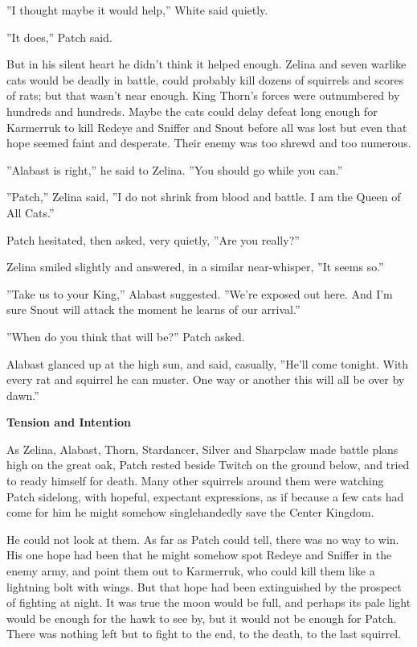 \documentclass[11pt]{article}
\begin{document}
 ''I thought maybe it would help,'' White said quietly.\par
 ''It does,'' Patch said.\par
 But in his silent heart he didn't think it helped enough. Zelina and seven warlike cats would be deadly in battle, could probably kill dozens of squirrels and scores of rats; but that wasn't near enough. King Thorn's forces were outnumbered by hundreds and hundreds. Maybe the cats could delay defeat long enough for Karmerruk to kill Redeye and Sniffer and Snout before all was lost %
 but even that hope seemed faint and desperate. Their enemy was too shrewd and too numerous.\par
 ''Alabast is right,'' he said to Zelina. ''You should go while you can.''\par
 ''Patch,'' Zelina said, ''I do not shrink from blood and battle. I am the Queen of All Cats.''\par
 Patch hesitated, then asked, very quietly, ''Are you really?''\par
 Zelina smiled slightly and answered, in a similar near-whisper, ''It seems so.''\par
 ''Take us to your King,'' Alabast suggested. ''We're exposed out here. And I'm sure Snout will attack the moment he learns of our arrival.''\par
 ''When do you think that will be?'' Patch asked.\par
 Alabast glanced up at the high sun, and said, casually, ''He'll come tonight. With every rat and squirrel he can muster. One way or another this will all be over by dawn.''\par
\par
{\bf Tension and Intention\par
}\par
 As Zelina, Alabast, Thorn, Stardancer, Silver and Sharpclaw made battle plans high on the great oak, Patch rested beside Twitch on the ground below, and tried to ready himself for death. Many other squirrels around them were watching Patch sidelong, with hopeful, expectant expressions, as if because a few cats had come for him he might somehow singlehandedly save the Center Kingdom.\par
He could not look at them. As far as Patch could tell, there was no way to win. His one hope had been that he might somehow spot Redeye and Sniffer in the enemy army, and point them out to Karmerruk, who could kill them like a lightning bolt with wings. But that hope had been extinguished by the prospect of fighting at night. It was true the moon would be full, and perhaps its pale light would be enough for the hawk to see by, but it would not be enough for Patch. There was nothing left but to fight to the end, to the death, to the last squirrel. \par
\end{document}
